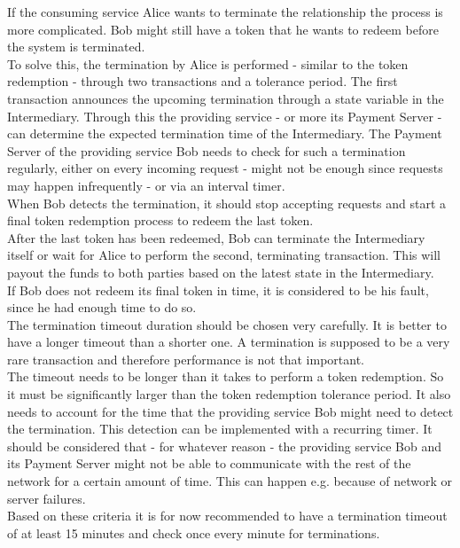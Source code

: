 \documentclass[a4paper,12pt]{scrartcl}
\begin{document}
If the consuming service Alice wants to terminate the relationship the process is more complicated. Bob might still have a token that he wants to redeem before the system is terminated.\\
To solve this, the termination by Alice is performed - similar to the token redemption - through two transactions and a tolerance period. The first transaction announces the upcoming termination through a state variable in the Intermediary. Through this the providing service - or more its Payment Server - can determine the expected termination time of the Intermediary. The Payment Server of the providing service Bob needs to check for such a termination regularly, either on every incoming request - might not be enough since requests may happen infrequently - or via an interval timer.\\
When Bob detects the termination, it should stop accepting requests and start a final token redemption process to redeem the last token.\\
After the last token has been redeemed, Bob can terminate the Intermediary itself or wait for Alice to perform the second, terminating transaction. This will payout the funds to both parties based on the latest state in the Intermediary.\\
If Bob does not redeem its final token in time, it is considered to be his fault, since he had enough time to do so.\\

The termination timeout duration should be chosen very carefully. It is better to have a longer timeout than a shorter one. A termination is supposed to be a very rare transaction and therefore performance is not that important.\\
The timeout needs to be longer than it takes to perform a token redemption. So it must be significantly larger than the token redemption tolerance period. It also needs to account for the time that the providing service Bob might need to detect the termination. This detection can be implemented with a recurring timer. It should be considered that - for whatever reason - the providing service Bob and its Payment Server might not be able to communicate with the rest of the network for a certain amount of time. This can happen e.g. because of network or server failures.\\

Based on these criteria it is for now recommended to have a termination timeout of at least 15 minutes and check once every minute for terminations.\\
\end{document}
